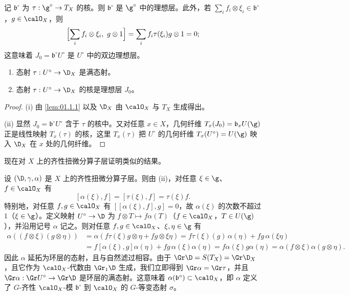 记 $\mathfrak{b}^\circ$ 为 $\tau:\g^\circ\to T_X$ 的核。则 $\mathfrak{b}^\circ$ 是 $\g^\circ$ 中的理想层。此外，若 $\sum_i f_i\otimes\xi_i\in\mathfrak{b}^\circ$，$g\in\calO_X$，则
$$\Bigl[\sum_i f_i\otimes\xi_i,\ g\otimes 1\Bigr]=\sum_i f_i\tau(\xi_i)g\otimes 1=0;$$
这意味着 $J_0=\mathfrak{b}^\circ U^\circ$ 是 $U^\circ$ 中的双边理想层。

\begin{proposition}\label{prop:01.2.2}
\begin{enumerate}[label=(\roman*)]
  \item 态射 $\tau:U^\circ\to\D_X$ 是满态射。
  \item 态射 $\tau:U^\circ\to\D_X$ 的核是理想层 $J_0$。
\end{enumerate}
\end{proposition}

\begin{proof}
(i) 由 \ref{lem:01.1.1} 以及 $\D_X$ 由 $\calO_X$ 与 $T_X$ 生成得出。

(ii) 显然 $J_0=\mathfrak{b}^\circ U^\circ$ 含于 $\tau$ 的核中。又对任意 $x\in X$，几何纤维 $T_x(J_0)=\mathfrak{b}_xU(\g)$ 正是线性映射 $T_x(\tau)$ 的核，这里 $T_x(\tau)$ 把 $U^\circ$ 的几何纤维 $T_x(U^\circ)=U(\g)$ 映入 $\D_X$ 在 $x$ 处的几何纤维。
\end{proof}

现在对 $X$ 上的齐性扭微分算子层证明类似的结果。

设 $(\D,\gamma,\alpha)$ 是 $X$ 上的齐性扭微分算子层。则由 (ii)，对任意 $\xi\in\g$、$f\in\calO_X$ 有
$$[\alpha(\xi),f]=[\tau(\xi),f]=\tau(\xi)f.$$
特别地，对任意 $f,g\in\calO_X$ 有 $[[\alpha(\xi),f],g]=0$，故 $\alpha(\xi)$ 的次数不超过 $1$（$\xi\in\g$）。定义映射 $U^\circ\to\D$ 为 $f\otimes T\mapsto f\alpha(T)$（$f\in\calO_X$，$T\in U(\g)$），并沿用记号 $\alpha$ 记之。则对任意 $f,g\in\calO_X$、$\xi,\eta\in\g$ 有
\begin{align*}
\alpha((f\otimes\xi)(g\otimes\eta))&=\alpha(f\tau(\xi)g\otimes\eta+fg\otimes\xi\eta)=f\tau(\xi)(g)\,\alpha(\eta)+fg\,\alpha(\xi\eta)\\
&=f[\alpha(\xi),g]\alpha(\eta)+fg\,\alpha(\xi)\alpha(\eta)=f\alpha(\xi)g\alpha(\eta)=\alpha(f\otimes\xi)\alpha(g\otimes\eta).
\end{align*}
因此 $\alpha$ 延拓为环层的态射，且与自然滤过相容。由于 $\Gr\D=S(T_X)=\Gr\D_X$，且它作为 $\calO_X$-代数由 $\Gr_1\D$ 生成，我们立即得到 $\Gr\alpha=\Gr\tau$，并且 $\Gr\alpha:\Gr U^\circ\to\Gr\D$ 是环层的满态射。这意味着 $\alpha(\mathfrak{b}^\circ)\subset\calO_X$，即 $\alpha$ 定义了 $G$-齐性 $\calO_X$-模 $\mathfrak{b}^\circ$ 到 $\calO_X$ 的 $G$-等变态射 $\sigma$。

